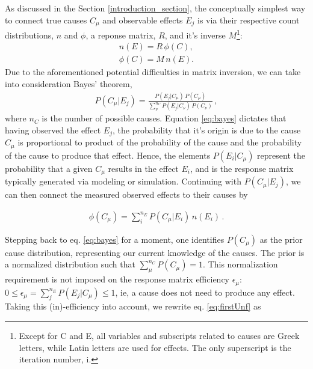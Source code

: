 As discussed in the Section \ref{introduction_section}, the conceptually simplest way to connect
true causes $C_{\mu}$ and observable effects $E_{j}$ is via their respective count distributions,
$n$ and $\phi$, a reponse matrix, $R$, and it's inverse 
$M$\footnote{\label{fnote1} Except for C and E, all variables and subscripts related to causes are Greek letters, 
while Latin letters are used for effects. The only superscript is the iteration number, i.}:
\begin{equation}
 \begin{split}
  n(E)=R \, \phi(C), \\
  \phi(C)=M \, n(E).
 \end{split}
\end{equation} 
Due to the aforementioned potential difficulties in matrix inversion, we can take
into consideration Bayes' theorem,
\begin{equation} \label{eq:bayes}
 \begin{split}
  P(C_{\mu}|E_{j})=\frac{P(E_{j}|C_{\mu}) \, P(C_{\mu})}{\sum_{\nu}^{n_{C}} P(E_{j}|C_{\nu}) \, P(C_{\nu})} \, ,
 \end{split}
\end{equation}
where $n_{C}$ is the number of possible causes.
Equation \ref{eq:bayes} dictates that having observed the effect $E_{j}$, the probability that it's origin is due
to the cause $C_{\mu}$ is proportional to product of the probability of the cause and the probability
of the cause to produce that effect. Hence, the elements $P(E_{i}|C_{\mu})$ represent the probability that a given 
$C_{\mu}$ results in the effect $E_{i}$, and is the response matrix typically generated via modeling or simulation.
Continuing with $P(C_{\mu}|E_{j})$, we can then connect the measured observed effects to their causes by

\begin{equation} \label{eq:firstUnf}
 \begin{split}
  \phi(C_{\mu}) = \sum_{i}^{n_{E}} P(C_{\mu}|E_{i}) \, n(E_{i}) \, .
 \end{split}
\end{equation}

Stepping back to eq. \ref{eq:bayes} for a moment, one identifies $P(C_{\mu})$ as the prior cause distribution, representing our current 
knowledge of the causes. The prior is a normalized distribution such that $\sum_{\mu}^{n_{C}}P(C_{\mu})=1$. 
This normalization requirement is not imposed on the response matrix efficiency $\epsilon_{\mu}$: 
$0 \leq \epsilon_{\mu} = \sum_{j}^{n_{E}}P(E_{j}|C_{\mu}) \leq 1$, 
ie, a cause does not need to produce any effect. Taking this (in)-efficiency into account, we rewrite eq. \ref{eq:firstUnf} as

